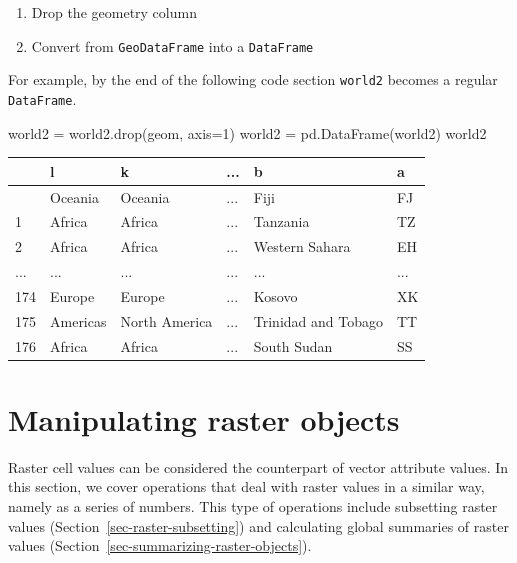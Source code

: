 \documentclass[
  letterpaper,
]{krantz}
\newenvironment{Shaded}{\begin{snugshade}}{\end{snugshade}}
\newcommand{\DecValTok}[1]{\textcolor[rgb]{0.68,0.00,0.00}{#1}}
\newcommand{\NormalTok}[1]{\textcolor[rgb]{0.00,0.23,0.31}{#1}}
\newcommand{\OperatorTok}[1]{\textcolor[rgb]{0.37,0.37,0.37}{#1}}
\newcommand{\StringTok}[1]{\textcolor[rgb]{0.13,0.47,0.30}{#1}}
\providecommand{\tightlist}{%
  \setlength{\itemsep}{0pt}\setlength{\parskip}{0pt}}\usepackage{longtable,booktabs,array}
\begin{document}
\begin{enumerate}
\def\labelenumi{\arabic{enumi}.}
\tightlist
\item
  Drop the geometry column
\item
  Convert from \texttt{GeoDataFrame} into a \texttt{DataFrame}
\end{enumerate}

For example, by the end of the following code section \texttt{world2}
becomes a regular \texttt{DataFrame}.

\begin{Shaded}
\begin{Highlighting}[]
\NormalTok{world2 }\OperatorTok{=}\NormalTok{ world2.drop(}\StringTok{\textquotesingle{}geom\textquotesingle{}}\NormalTok{, axis}\OperatorTok{=}\DecValTok{1}\NormalTok{)}
\NormalTok{world2 }\OperatorTok{=}\NormalTok{ pd.DataFrame(world2)}
\NormalTok{world2}
\end{Highlighting}
\end{Shaded}

\begin{longtable}[]{@{}llllll@{}}
\toprule\noalign{}
& l & k & ... & b & a \\
\midrule\noalign{}
\endhead
\bottomrule\noalign{}
\endlastfoot
0 & Oceania & Oceania & ... & Fiji & FJ \\
1 & Africa & Africa & ... & Tanzania & TZ \\
2 & Africa & Africa & ... & Western Sahara & EH \\
... & ... & ... & ... & ... & ... \\
174 & Europe & Europe & ... & Kosovo & XK \\
175 & Americas & North America & ... & Trinidad and Tobago & TT \\
176 & Africa & Africa & ... & South Sudan & SS \\
\end{longtable}

\section{Manipulating raster
objects}\label{sec-manipulating-raster-objects}

Raster cell values can be considered the counterpart of vector attribute
values. In this section, we cover operations that deal with raster
values in a similar way, namely as a series of numbers. This type of
operations include subsetting raster values
(Section~\ref{sec-raster-subsetting}) and calculating global summaries
of raster values (Section~\ref{sec-summarizing-raster-objects}).
\end{document}

